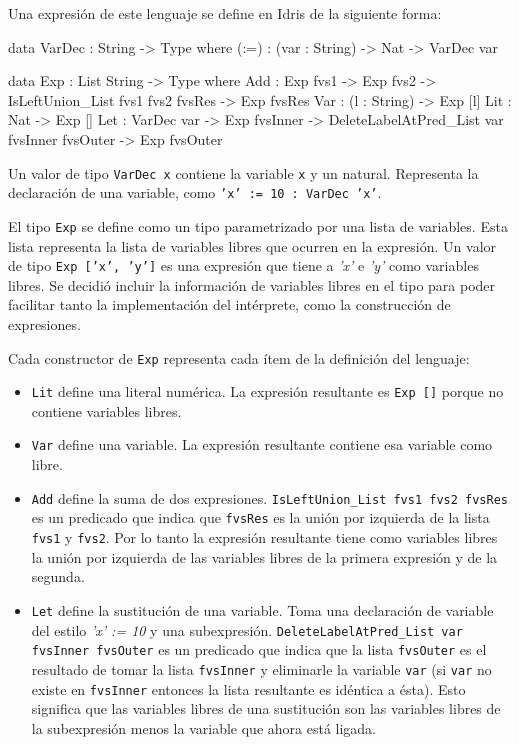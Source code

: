 Una expresión de este lenguaje se define en Idris de la siguiente forma:

\begin{code}
data VarDec : String -> Type where
  (:=) : (var : String) -> Nat -> VarDec var

data Exp : List String -> Type where
  Add : Exp fvs1 -> Exp fvs2 -> 
    IsLeftUnion_List fvs1 fvs2 fvsRes -> 
    Exp fvsRes 
  Var : (l : String) -> Exp [l]
  Lit : Nat -> Exp []
  Let : VarDec var -> Exp fvsInner -> 
    DeleteLabelAtPred_List var fvsInner fvsOuter -> 
    Exp fvsOuter
\end{code}

Un valor de tipo \texttt{VarDec x} contiene la variable \texttt{x} y un natural. Representa la declaración de una variable, como \texttt{'x' := 10 : VarDec 'x'}.

El tipo \texttt{Exp} se define como un tipo parametrizado por una lista de variables. Esta lista representa la lista de variables libres que ocurren en la expresión. Un valor de tipo \texttt{Exp ['x', 'y']} es una expresión que tiene a \textit{'x'} e \textit{'y'} como variables libres. Se decidió incluir la información de variables libres en el tipo para poder facilitar tanto la implementación del intérprete, como la construcción de expresiones.

Cada constructor de \texttt{Exp} representa cada ítem de la definición del lenguaje:
\begin{itemize}
\item \texttt{Lit} define una literal numérica. La expresión resultante es \texttt{Exp []} porque no contiene variables libres. 
\item \texttt{Var} define una variable. La expresión resultante contiene esa variable como libre.
\item \texttt{Add} define la suma de dos expresiones. \texttt{IsLeftUnion\_List fvs1 fvs2 fvsRes} es un predicado que indica que \texttt{fvsRes} es la unión por izquierda de la lista \texttt{fvs1} y \texttt{fvs2}. Por lo tanto la expresión resultante tiene como variables libres la unión por izquierda de las variables libres de la primera expresión y de la segunda.
\item \texttt{Let} define la sustitución de una variable. Toma una declaración de variable del estilo \textit{'x' := 10} y una subexpresión. \texttt{DeleteLabelAtPred\_List var fvsInner fvsOuter} es un predicado que indica que la lista \texttt{fvsOuter} es el resultado de tomar la lista \texttt{fvsInner} y eliminarle la variable \texttt{var} (si \texttt{var} no existe en \texttt{fvsInner} entonces la lista resultante es idéntica a ésta). Esto significa que las variables libres de una sustitución son las variables libres de la subexpresión menos la variable que ahora está ligada.
\end{itemize}

